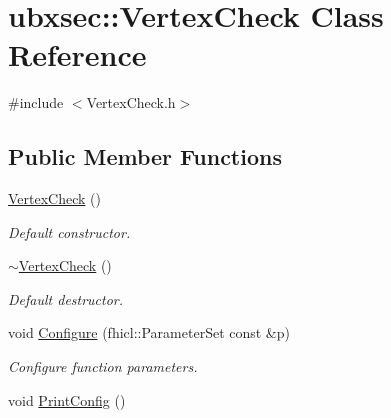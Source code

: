 \hypertarget{classubxsec_1_1VertexCheck}{\section{ubxsec\-:\-:\-Vertex\-Check \-Class \-Reference}
\label{classubxsec_1_1VertexCheck}
}


{\ttfamily \#include $<$\-Vertex\-Check.\-h$>$}

\subsection*{\-Public \-Member \-Functions}
\begin{DoxyCompactItemize}
\item 
\hypertarget{classubxsec_1_1VertexCheck_af6ef46e3fc198a067987f64ef863aa45}{\hyperlink{classubxsec_1_1VertexCheck_af6ef46e3fc198a067987f64ef863aa45}{\-Vertex\-Check} ()}\label{classubxsec_1_1VertexCheck_af6ef46e3fc198a067987f64ef863aa45}

\begin{DoxyCompactList}\small\item\em \-Default constructor. \end{DoxyCompactList}\item 
\hypertarget{classubxsec_1_1VertexCheck_a31f02bd272b70d96d3e20be2519c5b74}{\hyperlink{classubxsec_1_1VertexCheck_a31f02bd272b70d96d3e20be2519c5b74}{$\sim$\-Vertex\-Check} ()}\label{classubxsec_1_1VertexCheck_a31f02bd272b70d96d3e20be2519c5b74}

\begin{DoxyCompactList}\small\item\em \-Default destructor. \end{DoxyCompactList}\item 
\hypertarget{classubxsec_1_1VertexCheck_aa2b80d7c8c6eb06d53d44f5ea2810b22}{void \hyperlink{classubxsec_1_1VertexCheck_aa2b80d7c8c6eb06d53d44f5ea2810b22}{\-Configure} (fhicl\-::\-Parameter\-Set const \&p)}\label{classubxsec_1_1VertexCheck_aa2b80d7c8c6eb06d53d44f5ea2810b22}

\begin{DoxyCompactList}\small\item\em \-Configure function parameters. \end{DoxyCompactList}\item 
\hypertarget{classubxsec_1_1VertexCheck_acafba79c33116018ac9bc55b52b4c95d}{void \hyperlink{classubxsec_1_1VertexCheck_acafba79c33116018ac9bc55b52b4c95d}{\-Print\-Config} ()}\label{classubxsec_1_1VertexCheck_acafba79c33116018ac9bc55b52b4c95d}


\end{DoxyCompactItemize}
